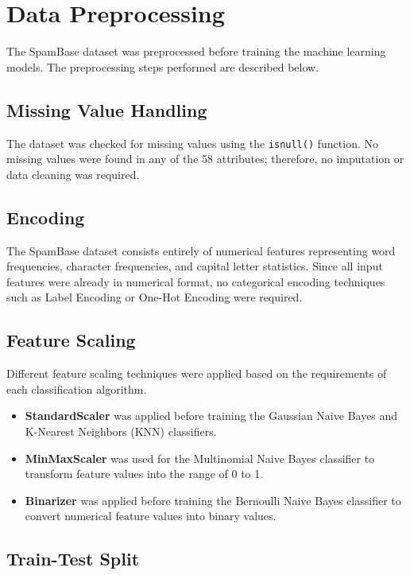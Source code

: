 \documentclass{article}
\begin{document}
\newpage
\section{Data Preprocessing}

The SpamBase dataset was preprocessed before training the machine learning models. The preprocessing steps performed are described below.

\subsection*{Missing Value Handling}

The dataset was checked for missing values using the \texttt{isnull()} function. No missing values were found in any of the 58 attributes; therefore, no imputation or data cleaning was required.

\subsection*{Encoding}

The SpamBase dataset consists entirely of numerical features representing word frequencies, character frequencies, and capital letter statistics. Since all input features were already in numerical format, no categorical encoding techniques such as Label Encoding or One-Hot Encoding were required.

\subsection*{Feature Scaling}

Different feature scaling techniques were applied based on the requirements of each classification algorithm.

\begin{itemize}
    \item \textbf{StandardScaler} was applied before training the Gaussian Naive Bayes and K-Nearest Neighbors (KNN) classifiers.
    \item \textbf{MinMaxScaler} was used for the Multinomial Naive Bayes classifier to transform feature values into the range of 0 to 1.
    \item \textbf{Binarizer} was applied before training the Bernoulli Naive Bayes classifier to convert numerical feature values into binary values.
\end{itemize}

\subsection*{Train-Test Split}
\end{document}
